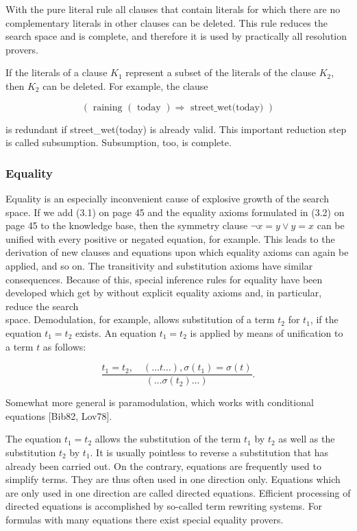 \documentclass[10pt]{article}
\begin{document}
With the pure literal rule all clauses that contain literals for which there are no complementary literals in other clauses can be deleted. This rule reduces the search space and is complete, and therefore it is used by practically all resolution provers.

If the literals of a clause $K_{1}$ represent a subset of the literals of the clause $K_{2}$, then $K_{2}$ can be deleted. For example, the clause

$$
(\text { raining }(\text { today }) \Rightarrow \text { street_wet(today) })
$$

is redundant if street\_wet(today) is already valid. This important reduction step is called subsumption. Subsumption, too, is complete.

\subsubsection*{Equality}
Equality is an especially inconvenient cause of explosive growth of the search space. If we add (3.1) on page 45 and the equality axioms formulated in (3.2) on page 45 to the knowledge base, then the symmetry clause $\neg x=y \vee y=x$ can be unified with every positive or negated equation, for example. This leads to the derivation of new clauses and equations upon which equality axioms can again be applied, and so on. The transitivity and substitution axioms have similar consequences. Because of this, special inference rules for equality have been developed which get by without explicit equality axioms and, in particular, reduce the search\\
space. Demodulation, for example, allows substitution of a term $t_{2}$ for $t_{1}$, if the equation $t_{1}=t_{2}$ exists. An equation $t_{1}=t_{2}$ is applied by means of unification to a term $t$ as follows:

$$
\frac{t_{1}=t_{2}, \quad(\ldots t \ldots), \sigma\left(t_{1}\right)=\sigma(t)}{\left(\ldots \sigma\left(t_{2}\right) \ldots\right)} .
$$

Somewhat more general is paramodulation, which works with conditional equations [Bib82, Lov78].

The equation $t_{1}=t_{2}$ allows the substitution of the term $t_{1}$ by $t_{2}$ as well as the substitution $t_{2}$ by $t_{1}$. It is usually pointless to reverse a substitution that has already been carried out. On the contrary, equations are frequently used to simplify terms. They are thus often used in one direction only. Equations which are only used in one direction are called directed equations. Efficient processing of directed equations is accomplished by so-called term rewriting systems. For formulas with many equations there exist special equality provers.
\end{document}
